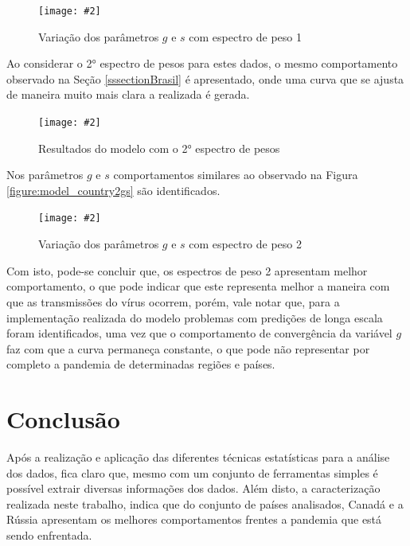 \documentclass[a4paper,12pt]{article}
\newcommand{\image}[4]{
    \begin{figure}[H]%
        \begin{center}
        \caption{#3}
        \texttt{[image: \#2]}
        \label{#4}
        \end{center}
    \end{figure}
}
\begin{document}
\image{0.75}{images/modelo/regiao/gs_modelo_MG_1.png}{Variação dos parâmetros $g$ e $s$ com espectro de peso 1}{figure:model_region1gs}

\par Ao considerar o 2° espectro de pesos para estes dados, o mesmo comportamento observado na Seção \ref{sssectionBrasil} é apresentado, onde uma curva que se ajusta de maneira muito mais clara a realizada é gerada. 

\image{0.85}{images/modelo/regiao/estimativa_MG_2.png}{Resultados do modelo com o 2° espectro de pesos}{figure:model_region2}

\par Nos parâmetros $g$ e $s$ comportamentos similares ao observado na Figura \ref{figure:model_country2gs} são identificados.

\image{0.75}{images/modelo/regiao/gs_modelo_MG_2.png}{Variação dos parâmetros $g$ e $s$ com espectro de peso 2}{figure:model_region2gs}

\par Com isto, pode-se concluir que, os espectros de peso 2 apresentam melhor comportamento, o que pode indicar que este representa melhor a maneira com que as transmissões do vírus ocorrem, porém, vale notar que, para a implementação realizada do modelo problemas com predições de longa escala foram identificados, uma vez que o comportamento de convergência da variável $g$ faz com que a curva permaneça constante, o que pode não representar por completo a pandemia de determinadas regiões e países.

\section{Conclusão}

\par Após a realização e aplicação das diferentes técnicas estatísticas para a análise dos dados, fica claro que, mesmo com um conjunto de ferramentas simples é possível extrair diversas informações dos dados. Além disto, a caracterização realizada neste trabalho, indica que do conjunto de países analisados, Canadá e a Rússia apresentam os melhores comportamentos frentes a pandemia que está sendo enfrentada.

% 
% 
\end{document}
